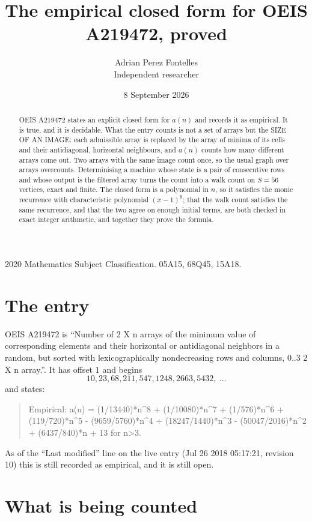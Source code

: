 \documentclass[11pt,a4paper]{article}
\title{The empirical closed form for OEIS A219472, proved}
\author{Adrian Perez Fontelles\\ \small Independent researcher}
\date{8 September 2026}
\theoremstyle{plain}
\theoremstyle{definition}
\begin{document}
\maketitle

\begin{abstract}
OEIS A219472 states an explicit closed form for $a(n)$ and records it as empirical. It is true, and
it is decidable. What the entry counts is not a set of arrays but the SIZE OF AN IMAGE: each
admissible array is replaced by the array of minima of its cells and their antidiagonal, horizontal neighbours,
and $a(n)$ counts how many different arrays come out. Two arrays with the same image count
once, so the usual graph over arrays overcounts. Determinising a machine whose state is a pair
of consecutive rows and whose output is the filtered array turns the count into a walk count on
$S=56$ vertices, exact and finite. The closed form is a polynomial in $n$, so it satisfies the
monic recurrence with characteristic polynomial $(x-1)^{9}$; that the walk count
satisfies the same recurrence, and that the two agree on enough initial terms, are both checked
in exact integer arithmetic, and together they prove the formula.
\end{abstract}

\noindent\small 2020 Mathematics Subject Classification. 05A15, 68Q45, 15A18.\normalsize

\section{The entry}

OEIS A219472 is ``Number of 2 X n arrays of the minimum value of corresponding elements and their horizontal or antidiagonal neighbors in a random, but sorted with lexicographically nondecreasing rows and columns, 0..3 2 X n array.''. It has offset $1$ and begins
\[
10, 23, 68, 211, 547, 1248, 2663, 5432,\ \dots
\]
and states:
\begin{quote}
Empirical: a(n) = (1/13440)*n\^{}8 + (1/10080)*n\^{}7 + (1/576)*n\^{}6 + (119/720)*n\^{}5 - (9659/5760)*n\^{}4 + (18247/1440)*n\^{}3 - (50047/2016)*n\^{}2 + (6437/840)*n + 13 for n>3.
\end{quote}
As of the ``Last modified'' line on the live entry (Jul 26 2018 05:17:21, revision 10)
this is still recorded as empirical, and it is still open.

\section{What is being counted}
\end{document}
